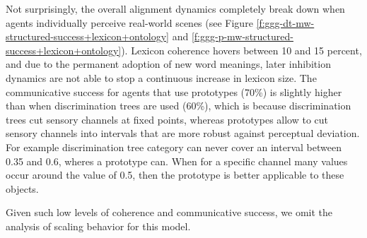 Not surprisingly, the overall alignment dynamics completely break down
when agents individually perceive real-world scenes (see Figure
\ref{f:ggg-dt-mw-structured-success+lexicon+ontology} and
\ref{f:ggg-p-mw-structured-success+lexicon+ontology}).  Lexicon
coherence hovers between 10 and 15 percent, and due to the permanent
adoption of new word meanings, later inhibition dynamics are not able
to stop a continuous increase in lexicon size. The communicative
success for agents that use prototypes (70\%) is slightly higher than
when discrimination trees are used (60\%), which is because
discrimination trees cut sensory channels at fixed points, whereas
prototypes allow to cut sensory channels into intervals that are more
robust against perceptual deviation. For example discrimination tree
category can never cover an interval between 0.35 and 0.6, wheres a
prototype can. When for a specific channel many values occur around
the value of 0.5, then the prototype is better applicable to these
objects.

Given such low levels of coherence and communicative success, we omit
the analysis of scaling behavior for this model.


